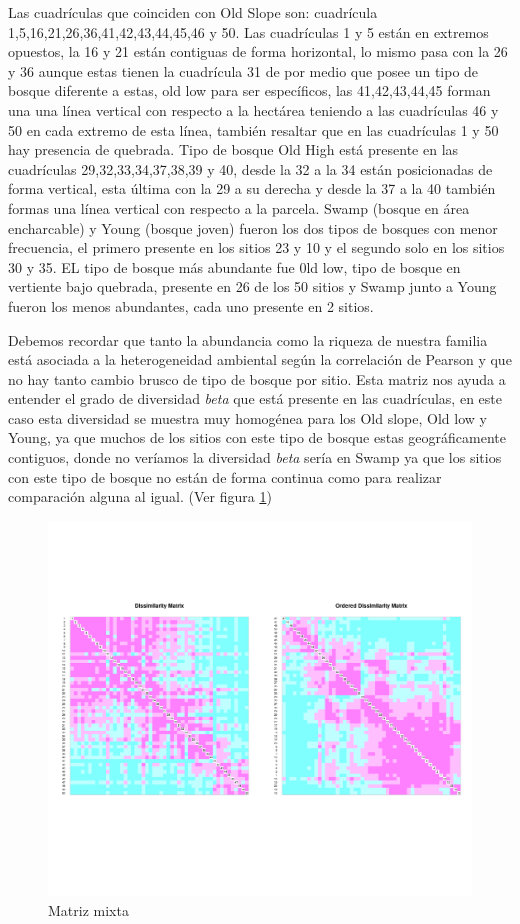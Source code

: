 \documentclass[11pt,]{article}
\begin{document}
Las cuadrículas que coinciden con Old Slope son: cuadrícula
1,5,16,21,26,36,41,42,43,44,45,46 y 50. Las cuadrículas 1 y 5 están en
extremos opuestos, la 16 y 21 están contiguas de forma horizontal, lo
mismo pasa con la 26 y 36 aunque estas tienen la cuadrícula 31 de por
medio que posee un tipo de bosque diferente a estas, old low para ser
específicos, las 41,42,43,44,45 forman una una línea vertical con
respecto a la hectárea teniendo a las cuadrículas 46 y 50 en cada
extremo de esta línea, también resaltar que en las cuadrículas 1 y 50
hay presencia de quebrada. Tipo de bosque Old High está presente en las
cuadrículas 29,32,33,34,37,38,39 y 40, desde la 32 a la 34 están
posicionadas de forma vertical, esta última con la 29 a su derecha y
desde la 37 a la 40 también formas una línea vertical con respecto a la
parcela. Swamp (bosque en área encharcable) y Young (bosque joven)
fueron los dos tipos de bosques con menor frecuencia, el primero
presente en los sitios 23 y 10 y el segundo solo en los sitios 30 y 35.
EL tipo de bosque más abundante fue 0ld low, tipo de bosque en vertiente
bajo quebrada, presente en 26 de los 50 sitios y Swamp junto a Young
fueron los menos abundantes, cada uno presente en 2 sitios.

Debemos recordar que tanto la abundancia como la riqueza de nuestra
familia está asociada a la heterogeneidad ambiental según la correlación
de Pearson y que no hay tanto cambio brusco de tipo de bosque por sitio.
Esta matriz nos ayuda a entender el grado de diversidad \emph{beta} que
está presente en las cuadrículas, en este caso esta diversidad se
muestra muy homogénea para los Old slope, Old low y Young, ya que muchos
de los sitios con este tipo de bosque estas geográficamente contiguos,
donde no veríamos la diversidad \emph{beta} sería en Swamp ya que los
sitios con este tipo de bosque no están de forma continua como para
realizar comparación alguna al igual. (Ver figura \ref{fig:punt_z})

\begin{figure}
\centering
\includegraphics{punt_z.png}
\caption{\label{fig:punt_z}Matriz mixta}
\end{figure}
\end{document}
